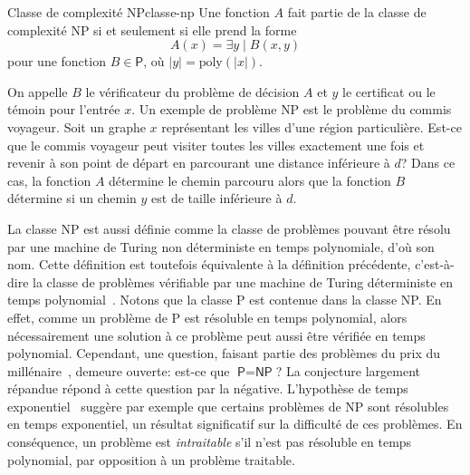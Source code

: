 \begin{maindefinition}{Classe de complexité \textsf{NP}}{classe-np}
    Une fonction $A$ fait partie de la classe de complexité \textsf{NP} si et seulement si elle prend la forme
    \begin{equation*}
        A(x) = \exists y \mid B(x,y)
    \end{equation*}
    pour une fonction $B \in  \textsf{P}$, où $\lvert y \rvert = \mathrm{poly}(\lvert x \rvert)$.
\end{maindefinition}

On appelle $B$ le vérificateur du problème de décision $A$ et $y$ le certificat ou le témoin pour l'entrée $x$. Un exemple de problème \textsf{NP} est le problème du commis voyageur. Soit un graphe $x$ représentant les villes d'une région particulière. Est-ce que le commis voyageur peut visiter toutes les villes exactement une fois et revenir à son point de départ en parcourant une distance inférieure à $d$? Dans ce cas, la fonction $A$ détermine le chemin parcouru alors que la fonction $B$ détermine si un chemin $y$ est de taille inférieure à $d$.

La classe \textsf{NP} est aussi définie comme la classe de problèmes pouvant être résolu par une machine de Turing non déterministe en temps polynomiale, d'où son nom. Cette définition est toutefois équivalente à la définition précédente, c'est-à-dire la classe de problèmes vérifiable par une machine de Turing déterministe en temps polynomial~\cite{sipserIntroductionTheoryComputation2012}. Notons que la classe \textsf{P} est contenue dans la classe \textsf{NP}. En effet, comme un problème de \textsf{P} est résoluble en temps polynomial, alors nécessairement une solution à ce problème peut aussi être vérifiée en temps polynomial. Cependant, une question, faisant partie des problèmes du prix du millénaire~\cite{carlsonMillenniumPrizeProblems2006}, demeure ouverte: est-ce que $\textsf{P} = \textsf{NP}$? La conjecture largement répandue répond à cette question par la négative. L'hypothèse de temps exponentiel~\cite{impagliazzoComplexityKSAT2001} suggère par exemple que certains problèmes de \textsf{NP} sont résolubles en temps exponentiel, un résultat significatif sur la difficulté de ces problèmes. En conséquence, un problème est \textit{intraitable} s'il n'est pas résoluble en temps polynomial, par opposition à un problème traitable. 



